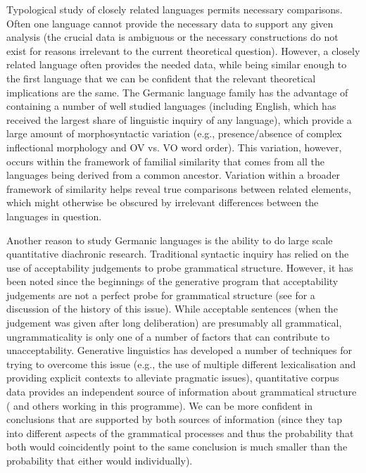 Typological study of closely related languages permits necessary comparisons. Often one language cannot provide the necessary data to support any given analysis (the crucial data is ambiguous or the necessary constructions do not exist for reasons irrelevant to the current theoretical question). However, a closely related language often provides the needed data, while being similar enough to the first language that we can be confident that the relevant theoretical implications are the same. The Germanic language family has the advantage of containing a number of well studied languages (including English, which has received the largest share of linguistic inquiry of any language), which provide a large amount of morphosyntactic variation (e.g., presence/absence of complex inflectional morphology and OV vs. VO word order). This variation, however, occurs within the framework of familial similarity that comes from all the languages being derived from a common ancestor. Variation within a broader framework of similarity helps reveal true comparisons between related elements, which might otherwise be obscured by irrelevant differences between the languages in question.

Another reason to study Germanic languages is the ability to do large scale quantitative diachronic research. Traditional syntactic inquiry has relied on the use of acceptability judgements to probe grammatical structure. However, it has been noted since the beginnings of the generative program that acceptability judgements are not a perfect probe for grammatical structure (see \citealt{Schutze.1996} for a discussion of the history of this issue). While acceptable sentences (when the judgement was given after long deliberation) are presumably all grammatical, ungrammaticality is only one of a number of factors that can contribute to unacceptability. Generative linguistics has developed a number of techniques for trying to overcome this issue (e.g., the use of multiple different lexicalisation and providing explicit contexts to alleviate pragmatic issues), quantitative corpus data provides an independent source of information about grammatical structure (\citealt{Kroch.1989,Kroch.1994} and others working in this programme). We can be more confident in conclusions that are supported by both sources of information (since they tap into different aspects of the grammatical processes and thus the probability that both would coincidently point to the same conclusion is much smaller than the probability that either would individually).

